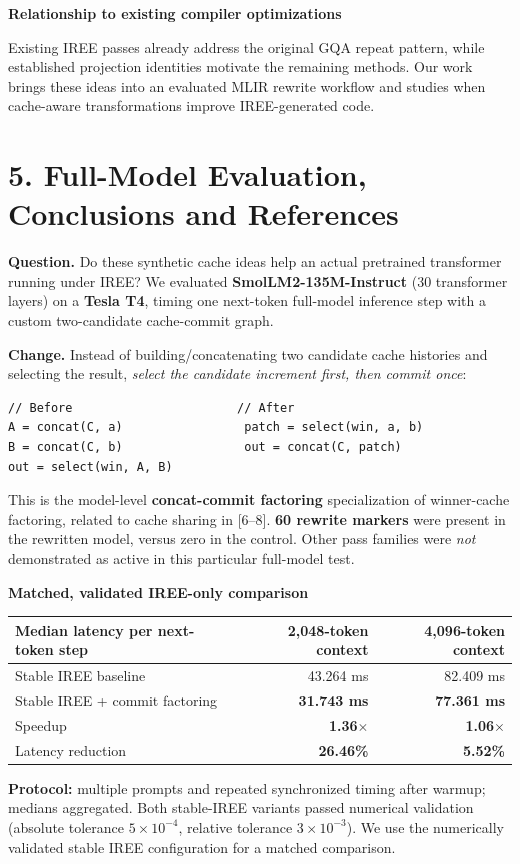 \documentclass[10pt,a4paper]{article}
\newcommand{\smallhead}[1]{\vspace{5pt}\textbf{#1}\par}
\begin{document}
\smallhead{Relationship to existing compiler optimizations}
Existing IREE passes already address the original GQA repeat pattern, while established projection identities motivate the remaining methods. Our work brings these ideas into an evaluated MLIR rewrite workflow and studies when cache-aware transformations improve IREE-generated code.
\vspace{-0.5cm}

\section*{5. Full-Model Evaluation, Conclusions and References}
\textbf{Question.} Do these synthetic cache ideas help an actual pretrained transformer running under IREE? We evaluated \textbf{SmolLM2-135M-Instruct} (30 transformer layers) on a \textbf{Tesla T4}, timing one next-token full-model inference step with a custom two-candidate cache-commit graph.

\textbf{Change.} Instead of building/concatenating two candidate cache histories and selecting the result, \emph{select the candidate increment first, then commit once}:
\begin{lstlisting}
// Before                       // After
A = concat(C, a)                 patch = select(win, a, b)
B = concat(C, b)                 out = concat(C, patch)
out = select(win, A, B)
\end{lstlisting}
This is the model-level \textbf{concat-commit factoring} specialization of winner-cache factoring, related to cache sharing in [6--8]. \textbf{60 rewrite markers} were present in the rewritten model, versus zero in the control. Other pass families were \emph{not} demonstrated as active in this particular full-model test.

\smallhead{Matched, validated IREE-only comparison}
\begin{center}
\begin{tabular}{lrr}\toprule
Median latency per next-token step & 2,048-token context & 4,096-token context\\\midrule
Stable IREE baseline & 43.264 ms & 82.409 ms\\
Stable IREE + commit factoring & \textbf{31.743 ms} & \textbf{77.361 ms}\\\midrule
Speedup & \textbf{1.36$\times$} & \textbf{1.06$\times$}\\
Latency reduction & \textbf{26.46\%} & \textbf{5.52\%}\\\bottomrule
\end{tabular}
\end{center}
\textbf{Protocol:} multiple prompts and repeated synchronized timing after warmup; medians aggregated. Both stable-IREE variants passed numerical validation (absolute tolerance $5\times10^{-4}$, relative tolerance $3\times10^{-3}$). We use the numerically validated stable IREE configuration for a matched comparison.
\end{document}
